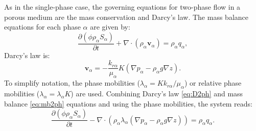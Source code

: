 \documentclass[12pt]{article}
\begin{document}
As in the single-phase case, the governing equations for two-phase flow in a porous medium are the mass conservation and Darcy's law. 
The mass balance equations for each phase $\alpha$ are given by:
\begin{equation}\label{eq:mb2ph}
 \frac{\partial(\phi \rho_{\alpha}S_{\alpha})}{\partial t}+\nabla \cdot ( \rho_{\alpha} \mathbf{v}_{\alpha})=\rho_{\alpha} q_{\alpha},
\end{equation}
Darcy's law is:
\begin{equation}\label{eq:D2ph}
\mathbf{v}_{\alpha}=-\frac{k_{r\alpha}}{\mu_{\alpha}} {K}(\nabla p_{\alpha}-\rho_{\alpha} g \nabla z).
\end{equation}
To simplify notation, the phase mobilities ($\lambda_{\alpha}=Kk_{r\alpha}/\mu_{\alpha}$) or relative phase mobilities ($\lambda_{\alpha}=\lambda_{\alpha}K$) are used. 
Combining Darcy's law \eqref{eq:D2ph} and mass balance \eqref{eq:mb2ph} equations and using the phase mobilities, the system reads:
\begin{equation}\label{eq:2ph}
 \frac{\partial(\phi \rho_{\alpha}S_{\alpha})}{\partial t}-\nabla \cdot ( \rho_{\alpha} \lambda_{\alpha}(\nabla p_{\alpha}-\rho_{\alpha} g \nabla z))=\rho_{\alpha} q_{\alpha}.
\end{equation}
\end{document}

